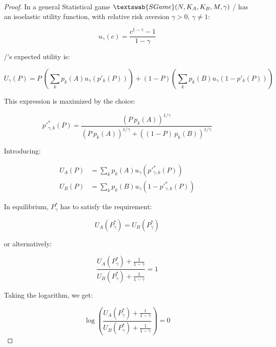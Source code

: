 \documentclass{article}
\theoremstyle{definition}
\newcommand{\SG}[1]{$\textswab{SGame}(#1)$}
\begin{document}
\begin{proof}

In a general Statistical game \SG{N,K_A,K_B,M,\gamma} \PI/ has an isoelastic utility function, with relative risk aversion $\gamma >0$, $\gamma \ne 1$:

\begin{equation}
    u_\gamma(c) = \frac{c^{1-\gamma}-1}{1-\gamma}
\end{equation}

\PI/'s expected utility is:

\begin{equation}
    U_\gamma(P) = P \ \left ( \sum_k p_k(A) u_\gamma(p'_k(P)) \right ) 
    + (1-P) \left ( \sum_k p_k(B) u_\gamma(1-p'_k(P)) \right )
\end{equation}

This expression is maximized by the choice:

\begin{equation}
    p'^*_{\gamma,k}(P) = \frac{(P \ p_k(A))^{1/\gamma}}{(P \ p_k(A))^{1/\gamma} + ((1-P) \  p_k(B))^{1/\gamma}}
\end{equation}

Introducing:

\begin{equation}
    \begin{split}
        U_A(P) &= \sum_k p_k(A) u_\gamma(p'^*_{\gamma,k}(P)) \\
        U_B(P) &= \sum_k p_k(B) u_\gamma(1-p'^*_{\gamma,k}(P)) 
    \end{split}
\end{equation}

In equilibrium, $P^*_\gamma$ has to satisfy the requirement:

\begin{equation}
    U_A(P^*_\gamma) = U_B(P^*_\gamma)
\end{equation}

or alternatively:

\begin{equation}
    \frac{U_A(P^*_\gamma) + \frac{1}{1-\gamma}}{U_B(P^*_\gamma) + \frac{1}{1-\gamma}} = 1
\end{equation}

Taking the logarithm, we get:

\begin{equation}
    \log \left ( \frac{U_A(P^*_\gamma) + \frac{1}{1-\gamma}}{U_B(P^*_\gamma) + \frac{1}{1-\gamma}} \right ) = 0
\end{equation}


\end{proof}
\end{document}
